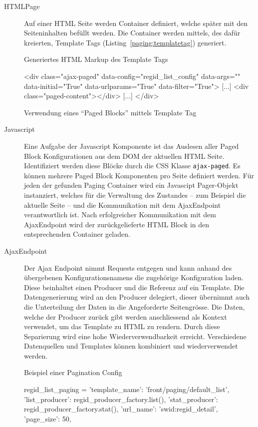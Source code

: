 \begin{description}
	\item[HTMLPage] Auf einer HTML Seite werden Container definiert, welche später
	mit den Seiteninhalten befüllt werden. Die Container werden mittels, des dafür
	kreierten, Template Tags (Listing~\ref{paging:templatetag}) generiert.

\begin{listing}[H]
\caption{Generiertes HTML Markup des Template Tags}
\label{paging:container}
\begin{htmlcode}
<div class="ajax-paged"
  data-config="regid_list_config"
  data-args="{}"
  data-initial="True"
  data-urlparams="True"
  data-filter="True">
	[...]
	<div class="paged-content"></div>
	[...]
</div>
\end{htmlcode}
\end{listing}

\begin{listing}[H]
\caption{Verwendung eines \enquote{Paged Blocks} mittels Template Tag}
\label{paging:templatetag}
\begin{pythoncode}
{%
\end{pythoncode}
\end{listing}

	\item[Javascript] Eine Aufgabe der Javascript Komponente ist das Auslesen aller
	Paged Block Konfigurationen aus dem DOM der aktuellen HTML Seite. Identifiziert
	werden diese Blöcke durch die CSS Klasse \texttt{ajax-paged}. Es können mehrere
	Paged Block Komponenten pro Seite definiert werden. Für jeden der gefunden
	Paging Container wird ein Javascipt Pager-Objekt instanziert, welches für die
	Verwaltung des Zustandes -- zum Beispiel die aktuelle Seite -- und die
	Kommunikation mit dem AjaxEndpoint verantwortlich ist. Nach erfolgreicher
	Kommunikation mit dem AjaxEndpoint wird der zurückgelieferte HTML Block in den
	entsprechenden Container geladen. 

	\item [AjaxEndpoint] Der Ajax Endpoint nimmt Requests entgegen und kann anhand
	des übergebenen Konfigurationsnamens die zugehörige Konfiguration laden. Diese
	beinhaltet einen Producer und die Referenz auf ein Template. Die
	Datengenerierung wird an den Producer delegiert, dieser übernimmt auch die
	Unterteilung der Daten in die Angeforderte  Seitengrösse. Die Daten, welche der
	Producer zurück gibt werden anschliessend als Kontext verwendet, um das
	Template zu HTML zu rendern. Durch diese Separierung wird eine hohe
	Wiederverwendbarkeit erreicht. Verschiedene Datenquellen und Templates können
	kombiniert und wiederverwendet werden.
	\begin{listing}[H]
\caption{Beispiel einer Pagination Config}
\begin{pythoncode}
regid_list_paging = {
    'template_name': 'front/paging/default_list',
    'list_producer': regid_producer_factory.list(),
    'stat_producer': regid_producer_factory.stat(),
    'url_name': 'swid:regid_detail',
    'page_size': 50,
}
\end{pythoncode}
\end{listing}


\end{description}
